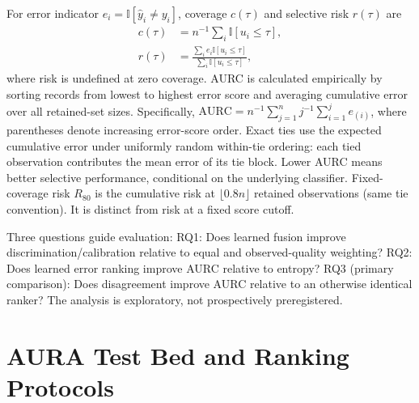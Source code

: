 \documentclass[conference]{IEEEtran}
\begin{document}
For error indicator $e_i=\mathbb{I}[\hat y_i\neq y_i]$, coverage $c(\tau)$ and selective risk $r(\tau)$ are
\begin{align}
c(\tau)&=n^{-1}\sum_i\mathbb{I}[u_i\leq\tau],\\
r(\tau)&=\frac{\sum_i e_i\mathbb{I}[u_i\leq\tau]}{\sum_i\mathbb{I}[u_i\leq\tau]},
\end{align}
where risk is undefined at zero coverage. AURC is calculated empirically by sorting records from lowest to highest error score and averaging cumulative error over all retained-set sizes. Specifically, $\mathrm{AURC}=n^{-1}\sum_{j=1}^{n}j^{-1}\sum_{i=1}^{j}e_{(i)}$, where parentheses denote increasing error-score order. Exact ties use the expected cumulative error under uniformly random within-tie ordering: each tied observation contributes the mean error of its tie block. Lower AURC means better selective performance, conditional on the underlying classifier. Fixed-coverage risk $R_{80}$ is the cumulative risk at $\lfloor0.8n\rfloor$ retained observations (same tie convention). It is distinct from risk at a fixed score cutoff.

Three questions guide evaluation: RQ1: Does learned fusion improve discrimination/calibration relative to equal and observed-quality weighting? RQ2: Does learned error ranking improve AURC relative to entropy? RQ3 (primary comparison): Does disagreement improve AURC relative to an otherwise identical ranker? The analysis is exploratory, not prospectively preregistered.
\section{AURA Test Bed and Ranking Protocols}
\end{document}
